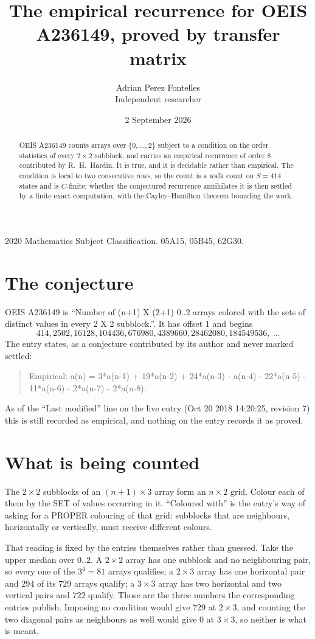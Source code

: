 \documentclass[11pt,a4paper]{article}
\title{The empirical recurrence for OEIS A236149, proved by transfer matrix}
\author{Adrian Perez Fontelles\\ \small Independent researcher}
\date{2 September 2026}
\theoremstyle{plain}
\theoremstyle{definition}
\begin{document}
\maketitle

\begin{abstract}
OEIS A236149 counts arrays over $\{0,\dots,2\}$ subject to a condition on the order
statistics of every $2\times2$ subblock, and carries an empirical recurrence of order
$8$ contributed by R.~H.~Hardin. It is true, and it is decidable rather than empirical.
The condition is local to two consecutive rows, so the count is a walk count on $S=414$
states and is $C$-finite; whether the conjectured recurrence annihilates it is then settled by
a finite exact computation, with the Cayley--Hamilton theorem bounding the work.
\end{abstract}

\noindent\small 2020 Mathematics Subject Classification. 05A15, 05B45, 62G30.\normalsize

\section{The conjecture}

OEIS A236149 is ``Number of (n+1) X (2+1) 0..2 arrays colored with the sets of distinct values in every 2 X 2 subblock.''. It has offset $1$ and begins
\[
414, 2502, 16128, 104436, 676980, 4389660, 28462080, 184549536,\ \dots
\]
The entry states, as a conjecture contributed by its author and never marked settled:
\begin{quote}
Empirical: a(n) = 3*a(n-1) + 19*a(n-2) + 24*a(n-3) - a(n-4) - 22*a(n-5) - 11*a(n-6) - 2*a(n-7) - 2*a(n-8).
\end{quote}
As of the ``Last modified'' line on the live entry (Oct 20 2018 14:20:25, revision 7) this is still
recorded as empirical, and nothing on the entry records it as proved.

\section{What is being counted}

The $2\times2$ subblocks of an $(n+1)\times3$ array form an
$n\times2$ grid. Colour each of them by the SET of values occurring in it. ``Coloured with'' is the entry's way of
asking for a PROPER colouring of that grid: subblocks that are neighbours, horizontally or
vertically, must receive different colours.

That reading is fixed by the entries themselves rather than guessed. Take the upper median
over $0..2$. A $2\times2$ array has one subblock and no neighbouring pair, so every one of the
$3^4=81$ arrays qualifies; a $2\times3$ array has one horizontal pair and $294$ of its $729$
arrays qualify; a $3\times3$ array has two horizontal and two vertical pairs and $722$
qualify. Those are the three numbers the corresponding entries publish. Imposing no condition
would give $729$ at $2\times3$, and counting the two diagonal pairs as neighbours as well
would give $0$ at $3\times3$, so neither is what is meant.
\end{document}
